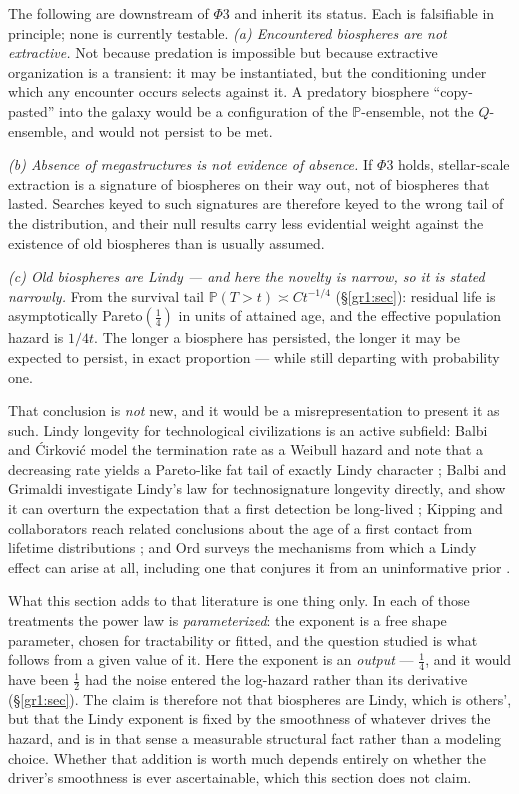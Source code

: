 \documentclass[11pt]{article}
\numberwithin{equation}{section}
\theoremstyle{plain}
\theoremstyle{definition}
\theoremstyle{remark}
\newcommand{\PP}{\mathbb{P}}
\begin{document}
The following are downstream of $\Phi3$ and inherit its status. Each is
falsifiable in principle; none is currently testable. \emph{(a) Encountered biospheres are not extractive.} Not because
predation is impossible but because extractive organization is a
transient: it may be instantiated, but the conditioning under which any
encounter occurs selects against it. A predatory biosphere
``copy-pasted'' into the galaxy would be a configuration of the
$\PP$-ensemble, not the $Q$-ensemble, and would not persist to be met.

\emph{(b) Absence of megastructures is not evidence of absence.} If
$\Phi3$ holds, stellar-scale extraction is a signature of biospheres on
their way out, not of biospheres that lasted. Searches keyed to such
signatures \cite{Dys60} are therefore keyed to the wrong tail of the
distribution, and their null results carry less evidential weight
against the existence of old biospheres than is usually assumed.

\emph{(c) Old biospheres are Lindy --- and here the novelty is narrow,
so it is stated narrowly.} From the survival tail
$\PP(T>t)\asymp Ct^{-1/4}$ (\S\ref{gr1:sec}): residual life is
asymptotically Pareto$(\tfrac14)$ in units of attained age, and the
effective population hazard is $1/4t$. The longer a biosphere has
persisted, the longer it may be expected to persist, in exact
proportion --- while still departing with probability one.

That conclusion is \emph{not} new, and it would be a misrepresentation
to present it as such. Lindy longevity for technological civilizations
is an active subfield: Balbi and \'Cirkovi\'c model the termination rate
as a Weibull hazard and note that a decreasing rate yields a
Pareto-like fat tail of exactly Lindy character \cite{BC21}; Balbi and
Grimaldi investigate Lindy's law for technosignature longevity directly,
and show it can overturn the expectation that a first detection be
long-lived \cite{BG24}; Kipping and collaborators reach related
conclusions about the age of a first contact from lifetime distributions
\cite{Kip20}; and Ord surveys the mechanisms from which a Lindy effect
can arise at all, including one that conjures it from an uninformative
prior \cite{Ord23,Tal12}.

What this section adds to that literature is one thing only. In each of
those treatments the power law is \emph{parameterized}: the exponent is
a free shape parameter, chosen for tractability or fitted, and the
question studied is what follows from a given value of it. Here the
exponent is an \emph{output} --- $\tfrac14$, and it would have been
$\tfrac12$ had the noise entered the log-hazard rather than its
derivative (\S\ref{gr1:sec}). The claim is therefore not that biospheres are
Lindy, which is others', but that the Lindy exponent is fixed by the
smoothness of whatever drives the hazard, and is in that sense a
measurable structural fact rather than a modeling choice. Whether that
addition is worth much depends entirely on whether the driver's
smoothness is ever ascertainable, which this section does not claim.
\end{document}
